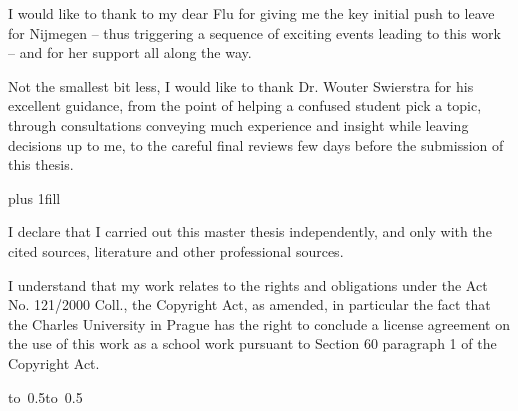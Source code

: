 \newpage



\openright

\noindent
I would like to thank to my dear Flu for giving me the key initial push to leave for
Nijmegen -- thus triggering a sequence of exciting events leading to this work --
and for her support all along the way.

Not the smallest bit less, I would like to thank Dr. Wouter Swierstra for his excellent
guidance, from the point of helping a confused student pick a topic, through consultations
conveying much experience and insight while leaving decisions up to me,
to the careful final reviews few days before the submission of this thesis.
\newpage


\vglue 0pt plus 1fill

\noindent
I declare that I carried out this master thesis independently, and only with the cited
sources, literature and other professional sources.

\medskip\noindent
I understand that my work relates to the rights and obligations under the Act No.
121/2000 Coll., the Copyright Act, as amended, in particular the fact that the Charles
University in Prague has the right to conclude a license agreement on the use of this
work as a school work pursuant to Section 60 paragraph 1 of the Copyright Act.

\vspace{10mm}

\hbox{\hbox to 0.5\hbox to 0.5}

\vspace{20mm}
\newpage


